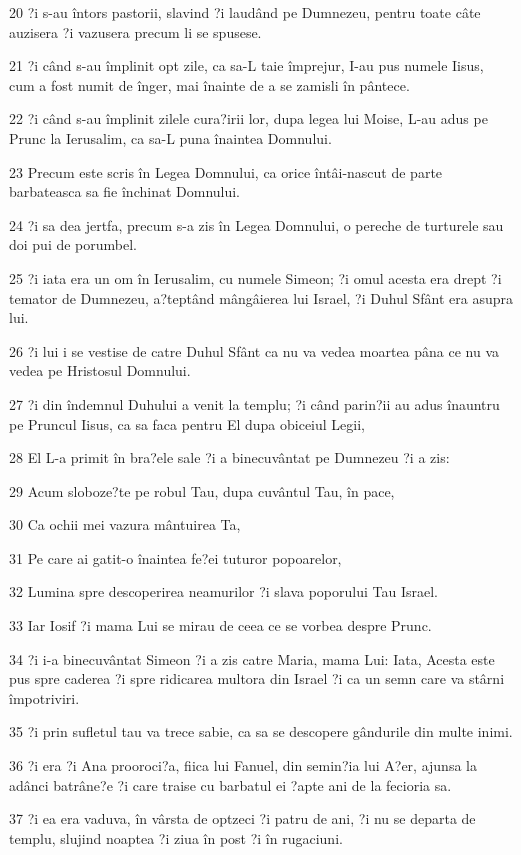 \par 20 ?i s-au întors pastorii, slavind ?i laudând pe Dumnezeu, pentru toate câte auzisera ?i vazusera precum li se spusese.
\par 21 ?i când s-au împlinit opt zile, ca sa-L taie împrejur, I-au pus numele Iisus, cum a fost numit de înger, mai înainte de a se zamisli în pântece.
\par 22 ?i când s-au împlinit zilele cura?irii lor, dupa legea lui Moise, L-au adus pe Prunc la Ierusalim, ca sa-L puna înaintea Domnului.
\par 23 Precum este scris în Legea Domnului, ca orice întâi-nascut de parte barbateasca sa fie închinat Domnului.
\par 24 ?i sa dea jertfa, precum s-a zis în Legea Domnului, o pereche de turturele sau doi pui de porumbel.
\par 25 ?i iata era un om în Ierusalim, cu numele Simeon; ?i omul acesta era drept ?i temator de Dumnezeu, a?teptând mângâierea lui Israel, ?i Duhul Sfânt era asupra lui.
\par 26 ?i lui i se vestise de catre Duhul Sfânt ca nu va vedea moartea pâna ce nu va vedea pe Hristosul Domnului.
\par 27 ?i din îndemnul Duhului a venit la templu; ?i când parin?ii au adus înauntru pe Pruncul Iisus, ca sa faca pentru El dupa obiceiul Legii,
\par 28 El L-a primit în bra?ele sale ?i a binecuvântat pe Dumnezeu ?i a zis:
\par 29 Acum sloboze?te pe robul Tau, dupa cuvântul Tau, în pace,
\par 30 Ca ochii mei vazura mântuirea Ta,
\par 31 Pe care ai gatit-o înaintea fe?ei tuturor popoarelor,
\par 32 Lumina spre descoperirea neamurilor ?i slava poporului Tau Israel.
\par 33 Iar Iosif ?i mama Lui se mirau de ceea ce se vorbea despre Prunc.
\par 34 ?i i-a binecuvântat Simeon ?i a zis catre Maria, mama Lui: Iata, Acesta este pus spre caderea ?i spre ridicarea multora din Israel ?i ca un semn care va stârni împotriviri.
\par 35 ?i prin sufletul tau va trece sabie, ca sa se descopere gândurile din multe inimi.
\par 36 ?i era ?i Ana prooroci?a, fiica lui Fanuel, din semin?ia lui A?er, ajunsa la adânci batrâne?e ?i care traise cu barbatul ei ?apte ani de la fecioria sa.
\par 37 ?i ea era vaduva, în vârsta de optzeci ?i patru de ani, ?i nu se departa de templu, slujind noaptea ?i ziua în post ?i în rugaciuni.
